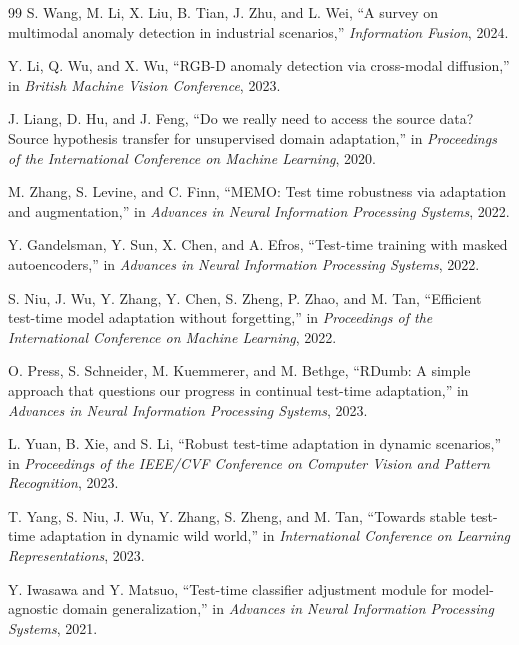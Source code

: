 \documentclass[10pt,conference]{IEEEtran}
\begin{document}
\begin{thebibliography}{99}
S. Wang, M. Li, X. Liu, B. Tian, J. Zhu, and L. Wei, ``A survey on
multimodal anomaly detection in industrial scenarios,'' \emph{Information
Fusion}, 2024.

Y. Li, Q. Wu, and X. Wu, ``RGB-D anomaly detection via cross-modal
diffusion,'' in \emph{British Machine Vision Conference}, 2023.

J. Liang, D. Hu, and J. Feng, ``Do we really need to access the source
data? Source hypothesis transfer for unsupervised domain adaptation,'' in
\emph{Proceedings of the International Conference on Machine Learning},
2020.

M. Zhang, S. Levine, and C. Finn, ``MEMO: Test time robustness via
adaptation and augmentation,'' in \emph{Advances in Neural Information
Processing Systems}, 2022.

Y. Gandelsman, Y. Sun, X. Chen, and A. Efros, ``Test-time training with
masked autoencoders,'' in \emph{Advances in Neural Information Processing
Systems}, 2022.

S. Niu, J. Wu, Y. Zhang, Y. Chen, S. Zheng, P. Zhao, and M. Tan,
``Efficient test-time model adaptation without forgetting,'' in
\emph{Proceedings of the International Conference on Machine Learning},
2022.

O. Press, S. Schneider, M. Kuemmerer, and M. Bethge, ``RDumb: A simple
approach that questions our progress in continual test-time adaptation,''
in \emph{Advances in Neural Information Processing Systems}, 2023.

L. Yuan, B. Xie, and S. Li, ``Robust test-time adaptation in dynamic
scenarios,'' in \emph{Proceedings of the IEEE/CVF Conference on Computer
Vision and Pattern Recognition}, 2023.

T. Yang, S. Niu, J. Wu, Y. Zhang, S. Zheng, and M. Tan, ``Towards
stable test-time adaptation in dynamic wild world,'' in
\emph{International Conference on Learning Representations}, 2023.

Y. Iwasawa and Y. Matsuo, ``Test-time classifier adjustment module for
model-agnostic domain generalization,'' in \emph{Advances in Neural
Information Processing Systems}, 2021.


\end{thebibliography}
\end{document}
